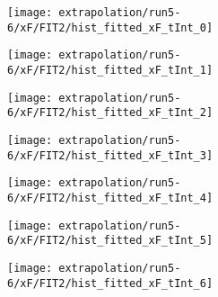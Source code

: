 \begin{figure}
	\centering
	\caption{Fit to the flask subtracted yield ratio with FIT2 for $x_F$ for run 5-6.}
	\label{fig:run5-6_FIT2_xF}
	\begin{subfigure}{0.45\linewidth}
		\texttt{[image: extrapolation/run5-6/xF/FIT2/hist\_fitted\_xF\_tInt\_0]}
	\end{subfigure}
	\begin{subfigure}{0.45\linewidth}
		\texttt{[image: extrapolation/run5-6/xF/FIT2/hist\_fitted\_xF\_tInt\_1]}
	\end{subfigure}
	\begin{subfigure}{0.45\linewidth}
		\texttt{[image: extrapolation/run5-6/xF/FIT2/hist\_fitted\_xF\_tInt\_2]}
	\end{subfigure}
	\begin{subfigure}{0.45\linewidth}
		\texttt{[image: extrapolation/run5-6/xF/FIT2/hist\_fitted\_xF\_tInt\_3]}
	\end{subfigure}
	\begin{subfigure}{0.45\linewidth}
		\texttt{[image: extrapolation/run5-6/xF/FIT2/hist\_fitted\_xF\_tInt\_4]}
	\end{subfigure}
	\begin{subfigure}{0.45\linewidth}
		\texttt{[image: extrapolation/run5-6/xF/FIT2/hist\_fitted\_xF\_tInt\_5]}
	\end{subfigure}
	\begin{subfigure}{0.45\linewidth}
		\texttt{[image: extrapolation/run5-6/xF/FIT2/hist\_fitted\_xF\_tInt\_6]}
	\end{subfigure}
\end{figure}
